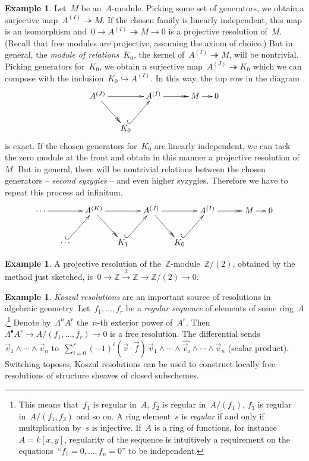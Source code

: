 \documentclass{amsart}
\theoremstyle{definition}
\newtheorem{ex}[defn]{Example}
\theoremstyle{plain}
\theoremstyle{remark}
\newcommand{\ZZ}{\mathbb{Z}}
\newcommand{\?}{\,{:}\,}
\renewcommand{\_}{\mathpunct{.}\,}
\begin{document}
\begin{ex}\label{ex:syzygies-resolution}Let~$M$ be an~$A$-module. Picking some
set of generators, we obtain a surjective map~$A^{(I)} \twoheadrightarrow M$.
If the chosen family is linearly independent, this map is an isomorphism and~$0
\to A^{(I)} \twoheadrightarrow M \to 0$ is a projective resolution of~$M$.
(Recall that free modules are projective, assuming the axiom of choice.) But in
general, the \emph{module of relations}~$K_0$, the kernel of~$A^{(I)}
\twoheadrightarrow M$, will be nontrivial. Picking generators for~$K_0$, we
obtain a surjective map~$A^{(J)} \twoheadrightarrow K_0$ which we can compose
with the inclusion~$K_0 \hookrightarrow A^{(I)}$. In this way, the top row in
the diagram
\[ \xymatrixcolsep{1pc}\xymatrix{
  A^{(J)} \ar[rr] \ar@{->>}[rd] & & A^{(I)} \ar@{->>}[rr] && M \ar[r] & 0 \\
  & K_0 \ar@{^{(}->}[ru]
} \]
is exact. If the chosen generators for~$K_0$ are linearly independent, we can
tack the zero module at the front and obtain in this manner a projective
resolution of~$M$. But in general, there will be nontrivial relations between
the chosen generators -- \emph{second syzygies} -- and even higher syzygies.
Therefore we have to repeat this process ad infinitum.
\[ \xymatrixcolsep{1pc}\xymatrix{
  \cdots \ar[rr] && A^{(K)} \ar@{->>}[rd] \ar[rr] && A^{(J)} \ar[rr] \ar@{->>}[rd] & & A^{(I)} \ar@{->>}[rr] && M \ar[r] & 0 \\
  & \cdots \ar@{^{(}->}[ru] && K_1 \ar@{^{(}->}[ru] && K_0 \ar@{^{(}->}[ru]
} \]
\end{ex}

\begin{ex}\label{ex:res-z2}A projective resolution of
the~$\ZZ$-module~$\ZZ/(2)$, obtained by the method just sketched, is~$0 \to \ZZ
\stackrel{2}{\to} \ZZ \to \ZZ/(2) \to 0$.
\end{ex}

\begin{ex}\emph{Koszul resolutions} are an important source of resolutions in
algebraic geometry. Let~$f_1,\ldots,f_r$ be a \emph{regular
sequence} of elements of some ring~$A$.\footnote{This means that~$f_1$ is
regular in~$A$, $f_2$ is regular in~$A/(f_1)$, $f_3$ is regular
in~$A/(f_1,f_2)$ and so on. A ring element~$s$ is \emph{regular} if and only if
multiplication by~$s$ is injective. If~$A$ is a ring of functions, for
instance~$A = k[x,y]$, regularity of the sequence is intuitively a requirement on the
equations~``$f_1=0,\ldots,f_n=0$'' to be independent.} Denote by~$\Lambda^n A^r$
the~$n$-th exterior power of~$A^r$. Then~$\Lambda^\bullet A^r \to
A/(f_1,\ldots,f_r) \to 0$ is a free resolution. The
differential sends~$\vec v_1 \wedge \cdots \wedge \vec v_n$ to~$\sum_{i=0}^r
(-1)^i (\vec v \cdot \vec f)\, \vec v_1 \wedge \cdots \wedge \widehat{\vec v_i}
\wedge \cdots \wedge \vec v_n$ (scalar product). Switching toposes, Koszul
resolutions can be used to construct locally free resolutions of structure
sheaves of closed subschemes.
\end{ex}
\end{document}
